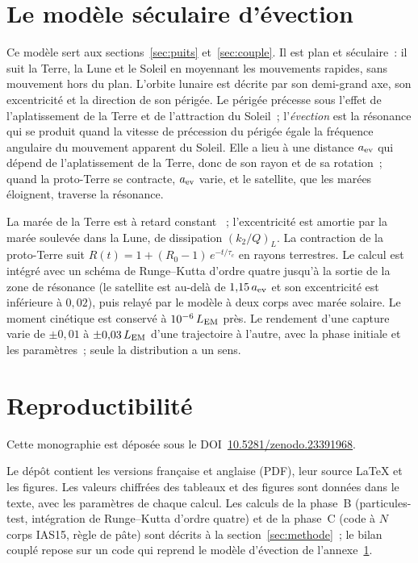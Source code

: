\documentclass[11pt,a4paper]{article}
\newcommand{\LEM}{\ensuremath{L_{\rm EM}}}
\begin{document}
\appendix
\section{Le modèle séculaire d'évection}
\label{app:evec}

Ce modèle sert aux sections~\ref{sec:puits} et~\ref{sec:couple}. Il est plan et séculaire~: il suit la Terre, la Lune et le Soleil en moyennant les mouvements rapides, sans mouvement hors du plan. L'orbite lunaire est décrite par son demi-grand axe, son excentricité et la direction de son périgée. Le périgée précesse sous l'effet de l'aplatissement de la Terre et de l'attraction du Soleil~; l'\emph{évection} est la résonance qui se produit quand la vitesse de précession du périgée égale la fréquence angulaire du mouvement apparent du Soleil. Elle a lieu à une distance $a_{\rm ev}$ qui dépend de l'aplatissement de la Terre, donc de son rayon et de sa rotation~; quand la proto-Terre se contracte, $a_{\rm ev}$ varie, et le satellite, que les marées éloignent, traverse la résonance.

La marée de la Terre est à retard constant \citep{Hut1981}~; l'excentricité est amortie par la marée soulevée dans la Lune, de dissipation $(k_2/Q)_L$. La contraction de la proto-Terre suit $R(t)=1+(R_0-1)\,e^{-t/\tau_c}$ en rayons terrestres. Le calcul est intégré avec un schéma de Runge--Kutta d'ordre quatre jusqu'à la sortie de la zone de résonance (le satellite est au-delà de $1{,}15\,a_{\rm ev}$ et son excentricité est inférieure à $0{,}02$), puis relayé par le modèle à deux corps avec marée solaire. Le moment cinétique est conservé à $10^{-6}\,\LEM$ près. Le rendement d'une capture varie de $\pm0{,}01$ à $\pm0{,}03\,\LEM$ d'une trajectoire à l'autre, avec la phase initiale et les paramètres~; seule la distribution a un sens.

\section{Reproductibilité}
\label{app:repro}

Cette monographie est déposée sous le DOI~\href{https://doi.org/10.5281/zenodo.23391968}{10.5281/zenodo.23391968}.

Le dépôt contient les versions française et anglaise (PDF), leur source \LaTeX{} et les figures. Les valeurs chiffrées des tableaux et des figures sont données dans le texte, avec les paramètres de chaque calcul. Les calculs de la phase~B (particules-test, intégration de Runge--Kutta d'ordre quatre) et de la phase~C (code à $N$ corps IAS15, règle de pâte) sont décrits à la section~\ref{sec:methode}~; le bilan couplé repose sur un code qui reprend le modèle d'évection de l'annexe~\ref{app:evec}.
\end{document}
